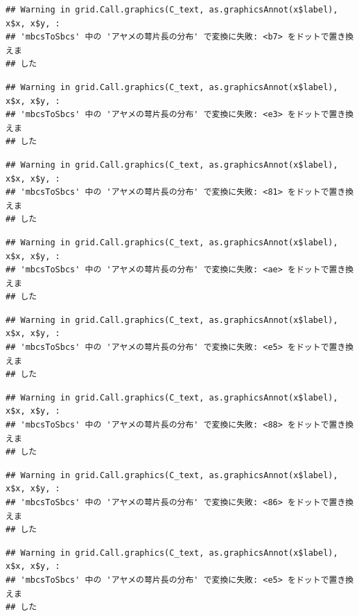 \documentclass[
]{book}
\begin{document}
\begin{verbatim}
## Warning in grid.Call.graphics(C_text, as.graphicsAnnot(x$label), x$x, x$y, :
## 'mbcsToSbcs' 中の 'アヤメの萼片長の分布' で変換に失敗: <b7> をドットで置き換えま
## した
\end{verbatim}

\begin{verbatim}
## Warning in grid.Call.graphics(C_text, as.graphicsAnnot(x$label), x$x, x$y, :
## 'mbcsToSbcs' 中の 'アヤメの萼片長の分布' で変換に失敗: <e3> をドットで置き換えま
## した
\end{verbatim}

\begin{verbatim}
## Warning in grid.Call.graphics(C_text, as.graphicsAnnot(x$label), x$x, x$y, :
## 'mbcsToSbcs' 中の 'アヤメの萼片長の分布' で変換に失敗: <81> をドットで置き換えま
## した
\end{verbatim}

\begin{verbatim}
## Warning in grid.Call.graphics(C_text, as.graphicsAnnot(x$label), x$x, x$y, :
## 'mbcsToSbcs' 中の 'アヤメの萼片長の分布' で変換に失敗: <ae> をドットで置き換えま
## した
\end{verbatim}

\begin{verbatim}
## Warning in grid.Call.graphics(C_text, as.graphicsAnnot(x$label), x$x, x$y, :
## 'mbcsToSbcs' 中の 'アヤメの萼片長の分布' で変換に失敗: <e5> をドットで置き換えま
## した
\end{verbatim}

\begin{verbatim}
## Warning in grid.Call.graphics(C_text, as.graphicsAnnot(x$label), x$x, x$y, :
## 'mbcsToSbcs' 中の 'アヤメの萼片長の分布' で変換に失敗: <88> をドットで置き換えま
## した
\end{verbatim}

\begin{verbatim}
## Warning in grid.Call.graphics(C_text, as.graphicsAnnot(x$label), x$x, x$y, :
## 'mbcsToSbcs' 中の 'アヤメの萼片長の分布' で変換に失敗: <86> をドットで置き換えま
## した
\end{verbatim}

\begin{verbatim}
## Warning in grid.Call.graphics(C_text, as.graphicsAnnot(x$label), x$x, x$y, :
## 'mbcsToSbcs' 中の 'アヤメの萼片長の分布' で変換に失敗: <e5> をドットで置き換えま
## した
\end{verbatim}
\end{document}
